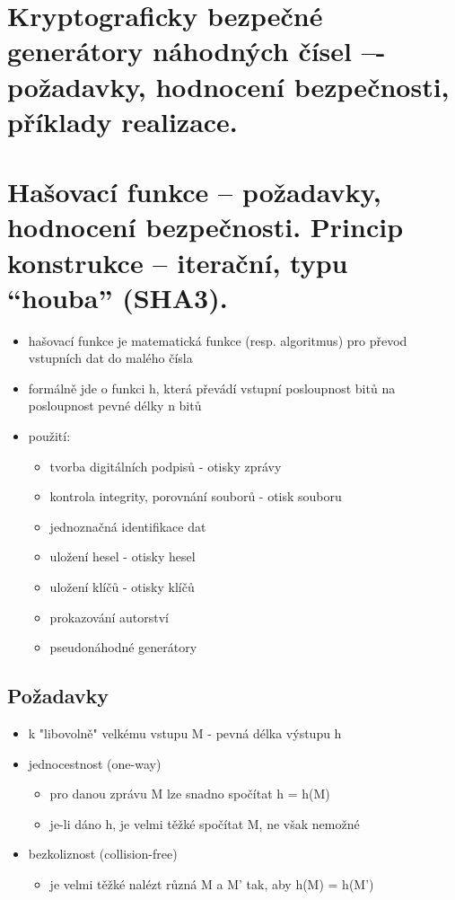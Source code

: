 \clearpage
\section{Kryptograficky bezpečné generátory náhodných čísel –- požadavky, hodnocení bezpečnosti, příklady realizace.}

\clearpage
\section{Hašovací funkce -- požadavky, hodnocení bezpečnosti. Princip konstrukce -- iterační, typu \enquote{houba} (SHA3).}
\begin{itemize}
    \item hašovací funkce je matematická funkce (resp. algoritmus) pro převod vstupních dat do malého čísla
    \item formálně jde o funkci h, která převádí vstupní posloupnost bitů na posloupnost pevné délky n bitů
    \item použití:
    \begin{itemize}
        \item tvorba digitálních podpisů - otisky zprávy
        \item kontrola integrity, porovnání souborů - otisk souboru
        \item jednoznačná identifikace dat
        \item uložení hesel - otisky hesel
        \item uložení klíčů - otisky klíčů
        \item prokazování autorství
        \item pseudonáhodné generátory \\
    \end{itemize}
\end{itemize}

\subsection{Požadavky}
\begin{itemize}
    \item k "libovolně" velkému vstupu M - pevná délka výstupu h
    \item jednocestnost (one-way)
    \begin{itemize}
        \item pro danou zprávu M lze snadno spočítat h = h(M)
        \item je-li dáno h, je velmi těžké spočítat M, ne však nemožné
    \end{itemize}
    \item bezkoliznost (collision-free)
    \begin{itemize}
        \item je velmi těžké nalézt různá M a M' tak, aby h(M) = h(M') \\
    \end{itemize}
\end{itemize}


